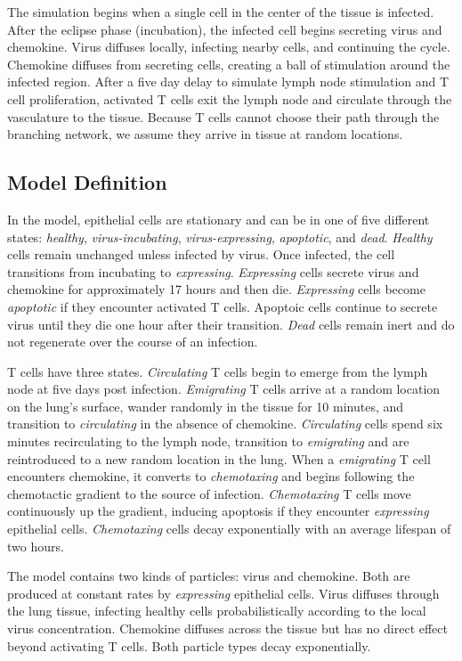 \documentclass[10pt]{article}
\begin{document}
The simulation begins when a single cell in the center of the tissue is infected. After the eclipse phase (incubation), the infected cell begins secreting virus and chemokine. Virus diffuses locally, infecting nearby cells, and continuing the cycle. Chemokine diffuses from secreting cells, creating a ball of stimulation around the infected region. After a five day delay to simulate lymph node stimulation and T cell proliferation, activated T cells exit the lymph node and circulate through the vasculature to the tissue. Because T  cells cannot choose their path through the branching network, we assume they arrive in tissue at random locations. 


\subsection*{Model Definition}

In the model, epithelial cells are stationary and can be in one of five different states: \emph{healthy}, \emph{virus-incubating}, \emph{virus-expressing}, \emph{apoptotic}, and \emph{dead}. \emph{Healthy} cells remain unchanged unless infected by virus. Once infected, the cell transitions from {incubating} to \emph{expressing}. \emph{Expressing} cells secrete virus and chemokine for approximately 17 hours and then die. \emph{Expressing} cells become \emph{apoptotic} if they encounter activated T cells. Apoptoic cells continue to secrete virus until they die one hour after their transition. \emph{Dead} cells remain inert and do not regenerate over the course of an infection.

T cells have three states. \emph{Circulating} T cells begin to emerge from the lymph node at five days post infection. \textit{Emigrating} T cells arrive at a random location on the lung's surface, wander randomly in the tissue for 10 minutes, and transition to \emph{circulating} in the absence of chemokine. \emph{Circulating} cells spend six minutes recirculating to the lymph node, transition to \emph{emigrating} and are reintroduced to a new random location in the lung. When a \emph{emigrating} T cell encounters chemokine, it converts to \emph{chemotaxing} and begins following the chemotactic gradient to the source of infection. \emph{Chemotaxing} T cells move continuously up the gradient, inducing apoptosis if they encounter \emph{expressing} epithelial cells. \emph{Chemotaxing} cells decay exponentially with an average lifespan of two hours. 

The model contains two kinds of particles: virus and chemokine. Both are produced at constant rates by \emph{expressing} epithelial cells.  Virus diffuses through the lung tissue, infecting healthy cells probabilistically according to the local virus concentration. Chemokine diffuses across the tissue but has no
direct effect beyond activating T cells. Both particle types decay exponentially.
\end{document}
